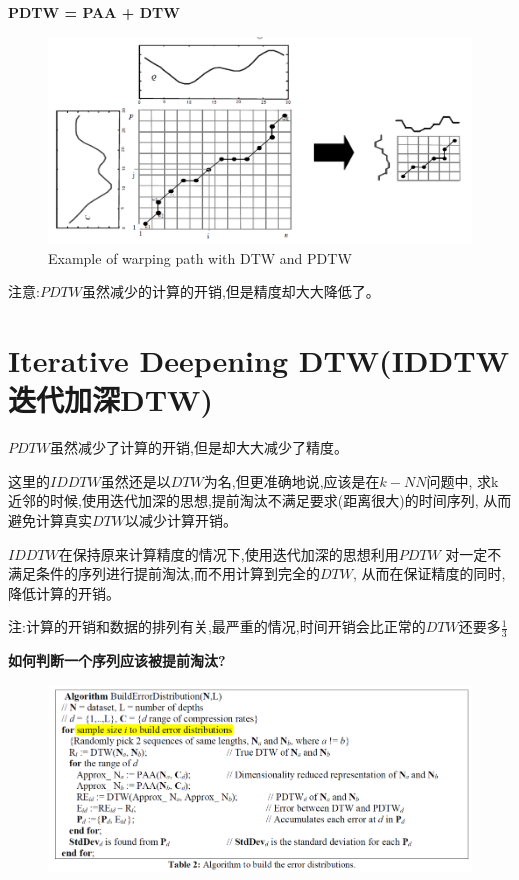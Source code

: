 \documentclass[UTF8,a4paper]{ctexart}
\newcommand{\spaceline}{\vspace{\baselineskip}}
\begin{document}
  \spaceline
  \textbf{PDTW = PAA + DTW}
  \begin{figure}[H]
    \centering
    \includegraphics[scale = 0.3]{assets/DynamicTimeWarping(DTW)_35d0b.png}
    \caption{Example of warping path with DTW and PDTW}
  \end{figure}

  注意:$PDTW$虽然减少的计算的开销,但是精度却大大降低了。

  \newpage
  \section{Iterative Deepening DTW(IDDTW 迭代加深DTW)}
  $PDTW$虽然减少了计算的开销,但是却大大减少了精度。

  这里的$IDDTW$虽然还是以$DTW$为名,但更准确地说,应该是在$k-NN$问题中,
  求k近邻的时候,使用迭代加深的思想,提前淘汰不满足要求(距离很大)的时间序列,
  从而避免计算真实$DTW$以减少计算开销。

  $IDDTW$在保持原来计算精度的情况下,使用迭代加深的思想利用$PDTW$
  对一定不满足条件的序列进行提前淘汰,而不用计算到完全的$DTW$,
  从而在保证精度的同时,降低计算的开销。

  注:计算的开销和数据的排列有关,最严重的情况,时间开销会比正常的$DTW$还要多$\frac{1}{3}$

  \spaceline
  \textbf{如何判断一个序列应该被提前淘汰?}
  \begin{figure}[H]
    \centering
    \includegraphics[width = \textwidth]{assets/DynamicTimeWarping(DTW)_58939.png}
  \end{figure}
\end{document}
